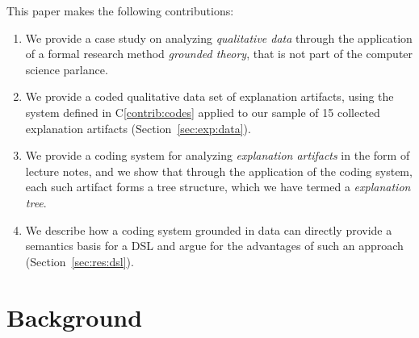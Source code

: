 \documentclass[sigconf]{acmart}
\begin{document}
This paper makes the following contributions:
%
\begin{enumerate}[C1.]

\item \label{contrib:method}
  We provide a case study on analyzing \emph{qualitative data} through the
  application of a formal research method \emph{grounded theory}, that is not
  part of the computer science parlance.

\item \label{contrib:data}
%
We provide a coded qualitative data set of explanation artifacts, using the
system defined in C\ref{contrib:codes} applied to our sample of 15 collected
explanation artifacts (Section~\ref{sec:exp:data}).

\item \label{contrib:codes}
%
We provide a coding system for analyzing \emph{explanation artifacts} in the
form of lecture notes, and we show that through the application of the coding
system, each such artifact forms a tree structure, which we have termed a
\emph{explanation tree}.


\item \label{contrib:dsl}
%
  We describe how a coding system grounded in data can directly provide a
  semantics basis for a DSL and argue for the advantages of such an approach
  (Section~\ref{sec:res:dsl}).
%
\end{enumerate}

\noindent

\section{Background}
\label{sec:back}





\end{document}
